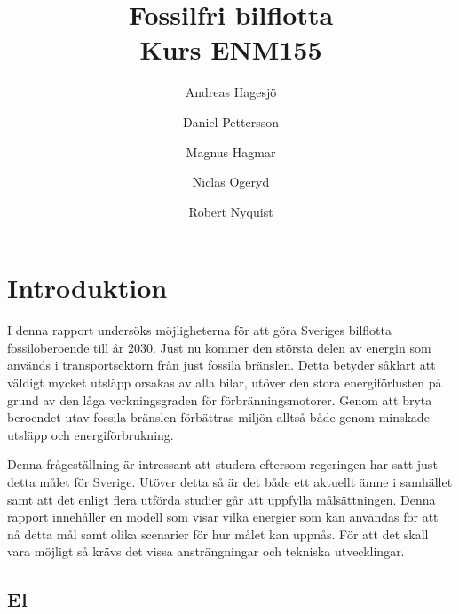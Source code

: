 \documentclass[a4paper,11pt,fleqn, titlepage]{article}
\author{Andreas Hagesjö \and Daniel Pettersson \and
Magnus Hagmar \and Niclas Ogeryd \and Robert Nyquist}
\title{Fossilfri bilflotta \\ Kurs ENM155}
\begin{document}
\maketitle

\section{Introduktion}
I denna rapport undersöks möjligheterna för att göra Sveriges bilflotta
fossiloberoende till år 2030. Just nu kommer den största delen av energin
som används i transportsektorn från just fossila bränslen. Detta betyder
såklart att väldigt mycket utsläpp orsakas av alla bilar, utöver den stora
energiförlusten på grund av den låga verkningsgraden för
förbränningsmotorer. Genom att bryta beroendet utav fossila bränslen
förbättras miljön alltså både genom minskade utsläpp och energiförbrukning.

Denna frågeställning är intressant att studera eftersom regeringen har satt
just detta målet för Sverige. Utöver detta så är det både ett aktuellt ämne
i samhället samt att det enligt flera utförda studier går att uppfylla
målsättningen. Denna rapport innehåller en modell som visar vilka energier
som kan användas för att nå detta mål samt olika scenarier för hur målet
kan uppnås. För att det skall vara möjligt så krävs det vissa
ansträngningar och tekniska utvecklingar.

\subsection{El}
\end{document}
